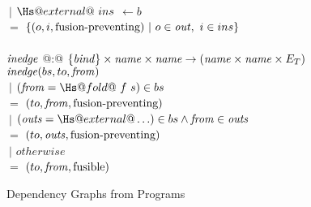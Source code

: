 \begin{figure}
\begin{tabbing}
\\[1ex]
   \> $~|$ \> $\Hs@external@~ins$ \> \> $\gets b$ \\
    \> $=$    \> $\{(o,i, \mbox{fusion-preventing}) ~|~ o \in \mathit{out},~ i \in ins \}$
\\
\\
$\mathit{inedge}$ @:@ $\{\mathit{bind}\} \times \mathit{name} \times \mathit{name} \to (\mathit{name} \times \mathit{name} \times E_T)$
\\
$\mathit{inedge}(bs,to,\mathit{from})$ \\
    \> $~|$ \> $(\from = \Hs@fold@~f~s) \in bs$     \\
    \> $=$ \> $(to, \mathit{from}, \mbox{fusion-preventing})$
\\[1ex]
    \> $~|$ \> $(\outs = \Hs@external@ \ldots) \in bs     \wedge \from \in \outs$     \\
    \> $=$ \> $(to, \mathit{outs}, \mbox{fusion-preventing})$
\\[1ex]
    \> $~|$ \> $otherwise$                      \\
    \> $=$ \> $(to, \mathit{from}, \mathrm{fusible})$
\end{tabbing}

\caption{Dependency Graphs from Programs}
\label{clustering:f:DependencyGraph}
\end{figure}


